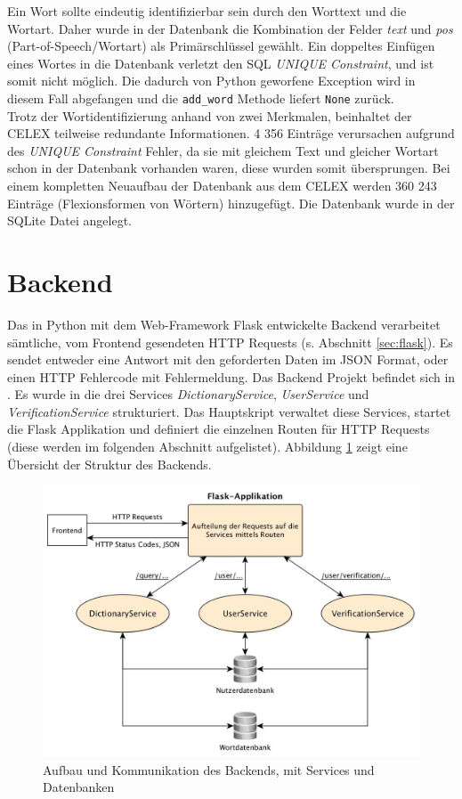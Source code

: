 Ein Wort sollte eindeutig identifizierbar sein durch den Worttext und die Wortart. Daher wurde in der Datenbank die Kombination der Felder \textit{text} und \textit{pos} (Part-of-Speech/Wortart) als Primärschlüssel gewählt. Ein doppeltes Einfügen eines Wortes in die Datenbank verletzt den SQL \textit{UNIQUE Constraint}, und ist somit nicht möglich. Die dadurch von Python geworfene Exception wird in diesem Fall abgefangen und die \texttt{add\_word} Methode liefert \texttt{None} zurück.\\
Trotz der Wortidentifizierung anhand von zwei Merkmalen, beinhaltet der CELEX teilweise redundante Informationen. 4 356 Einträge verursachen aufgrund des \textit{UNIQUE Constraint} Fehler, da sie mit gleichem Text und gleicher Wortart schon in der Datenbank vorhanden waren, diese wurden somit übersprungen. Bei einem kompletten Neuaufbau der Datenbank aus dem CELEX werden 360 243 Einträge (Flexionsformen von Wörtern) hinzugefügt. Die Datenbank wurde in der SQLite Datei  angelegt.

\section{Backend}
\label{sec:etwicklung-backend}
Das in Python mit dem Web-Framework Flask entwickelte Backend verarbeitet sämtliche, vom Frontend gesendeten HTTP Requests (s. Abschnitt \ref{sec:flask}). Es sendet entweder eine Antwort mit den geforderten Daten im JSON Format, oder einen HTTP Fehlercode mit Fehlermeldung. Das Backend Projekt befindet sich in . Es wurde in die drei Services \textit{DictionaryService}, \textit{UserService} und \textit{VerificationService} strukturiert. Das Hauptskript  verwaltet diese Services, startet die Flask Applikation und definiert die einzelnen Routen für HTTP Requests (diese werden im folgenden Abschnitt aufgelistet). Abbildung \ref{fig:backend} zeigt eine Übersicht der Struktur des Backends.

\begin{figure}[h!]
	\centering
	\includegraphics[width=.8\linewidth]{figures/backend}
	\caption{Aufbau und Kommunikation des Backends, mit Services und Datenbanken}
	\label{fig:backend}
\end{figure}

